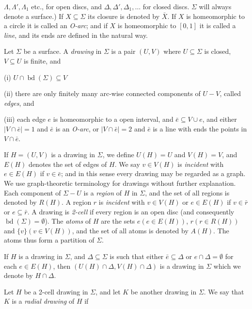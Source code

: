 \noindent $\Lambda, \Lambda', \Lambda_1$ etc., for open discs, and $\Delta, \Delta', \Delta_1, \dots$ for closed discs. $\Sigma$ will always denote a surface.) If $X \subseteq \Sigma$ its closure is denoted by $\bar{X}$. If $X$ is homeomorphic to a circle it is called an \textit{O-arc}; and if $X$ is homeomorphic to $[0, 1]$ it is called a \textit{line}, and its ends are defined in the natural way.

Let $\Sigma$ be a surface. A \textit{drawing} in $\Sigma$ is a pair $(U, V)$ where $U \subseteq \Sigma$ is closed, $V \subseteq U$ is finite, and

\hspace*{12pt}(i) $U \cap \operatorname{bd}(\Sigma) \subseteq V$

\hspace*{12pt}(ii) there are only finitely many arc-wise connected components of $U - V$, called \textit{edges}, and

\hspace*{12pt}(iii) each edge $e$ is homeomorphic to a open interval, and $\bar{e} \subseteq V \cup e$, and either $|V \cap \bar{e}| = 1$ and $\bar{e}$ is an \textit{O-arc}, or $|V \cap \bar{e}| = 2$ and $\bar{e}$ is a line with ends the points in $V \cap \bar{e}$.

If $H = (U, V)$ is a drawing in $\Sigma$, we define $U(H) = U$ and $V(H) = V$, and $E(H)$ denotes the set of edges of $H$. We say $v \in V(H)$ is \textit{incident} with $e \in E(H)$ if $v \in \bar{e}$; and in this sense every drawing may be regarded as a graph. We use graph-theoretic terminology for drawings without further explanation. Each component of $\Sigma - U$ is a \textit{region} of $H$ in $\Sigma$, and the set of all regions is denoted by $R(H)$. A region $r$ is \textit{incident} with $v \in V(H)$ or $e \in E(H)$ if $v \in \bar{r}$ or $e \subseteq \bar{r}$. A drawing is \textit{2-cell} if every region is an open disc (and consequently $\operatorname{bd}(\Sigma) = \emptyset$). The \textit{atoms} of $H$ are the sets $e (e \in E(H))$, $r (r \in R(H))$ and $\{v\} (v \in V(H))$, and the set of all atoms is denoted by $A(H)$. The atoms thus form a partition of $\Sigma$.

If $H$ is a drawing in $\Sigma$, and $\Delta \subseteq \Sigma$ is such that either $\bar{e} \subseteq \Delta$ or $e \cap \Delta = \emptyset$ for each $e \in E(H)$, then $(U(H) \cap \Delta, V(H) \cap \Delta)$ is a drawing in $\Sigma$ which we denote by $H \cap \Delta$.

Let $H$ be a 2-cell drawing in $\Sigma$, and let $K$ be another drawing in $\Sigma$. We say that $K$ is a \textit{radial drawing} of $H$ if

